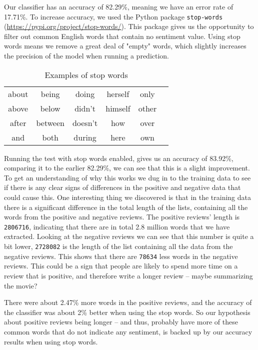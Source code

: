 \documentclass[a4paper,12pt]{article}
\begin{document}
Our classifier has an accuracy of 82.29\%, meaning we have an error rate of 17.71\%. To increase accuracy, we used the Python package \texttt{stop-words} (\url{https://pypi.org/project/stop-words/}). This package gives us the opportunity to filter out common English words that contain no sentiment value. Using stop words means we remove a great deal of "empty" words, which slightly increases the precision of the model when running a prediction.
\begin{table}[h!]
\begin{center}
\begin{tabular}{ c c c c c c}
 about & being & doing & herself & only\\ 
 above & below & didn't & himself & other\\  
 after & between & doesn't & how & over\\
 and & both & during & here & own
\end{tabular}
\caption*{Examples of stop words}
\end{center}
\end{table}
Running the test with stop words enabled, gives us an accuracy of 83.92\%, comparing it to the earlier 82.29\%, we can see that this is a slight improvement. To get an understanding of why this works we dug in to the training data to see if there is any clear signs of differences in the positive and negative data that could cause this. One interesting thing we discovered is that in the training data there is a significant difference in the total length of the lists, containing all the words from the positive and negative reviews. The positive reviews' length is \texttt{2806716}, indicating that there are in total {2.8 million words} that we have extracted. Looking at the negative reviews we can see that this number is quite a bit lower, \texttt{2728082} is the length of the list containing all the data from the negative reviews. This shows that there are \texttt{78634} less words in the negative reviews. This could be a sign that people are likely to spend more time on a review that is positive, and therefore write a longer review -- maybe summarizing the movie? 

There were about 2.47\% more words in the positive reviews, and the accuracy of the classifier was about 2\% better when using the stop words. So our hypothesis about positive reviews being longer -- and thus, probably have more of these common words that do not indicate any sentiment, is backed up by our accuracy results when using stop words.
\end{document}
